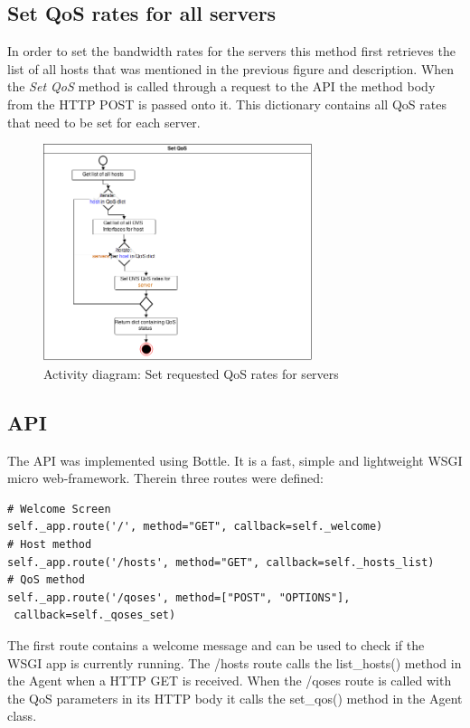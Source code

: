 \subsection{Set QoS rates for all servers}

In order to set the bandwidth rates for the servers this method first retrieves the list of all hosts that was mentioned in the previous figure and description. When the \textit{Set QoS} method is called through a request to the API the method body from the HTTP POST is passed onto it. This dictionary contains all QoS rates that need to be set for each server. 


\begin{figure}[H]
\centering

\includegraphics[width=0.7\textwidth]{images/design/activity_set_qos}

\caption{Activity diagram: Set requested QoS rates for servers}
\end{figure}


\subsection{API}

The API was implemented using Bottle. It is a fast, simple and lightweight WSGI micro web-framework. Therein three routes were defined:
\begin{lstlisting}
# Welcome Screen
self._app.route('/', method="GET", callback=self._welcome)
# Host method
self._app.route('/hosts', method="GET", callback=self._hosts_list)
# QoS method
self._app.route('/qoses', method=["POST", "OPTIONS"],
 callback=self._qoses_set)
\end{lstlisting}

The first route contains a welcome message and can be used to check if the WSGI app is currently running.
The /hosts route calls the list\_hosts() method in the Agent when a HTTP GET is received.
When the /qoses route is called with the QoS parameters in its HTTP body it calls the set\_qos() method in the Agent class.

